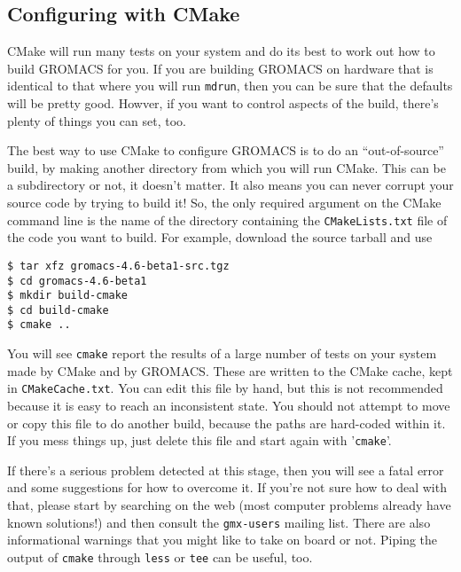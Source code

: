 \documentclass{article}[12pt,a4paper,twoside]
\newcommand{\gromacs}{GROMACS}
\newcommand{\cmake}{CMake}
\begin{document}
\subsection{Configuring with \cmake{}}

\cmake{} will run many tests on your system and do its best to work
out how to build \gromacs{} for you. If you are building \gromacs{} on
hardware that is identical to that where you will run \texttt{mdrun},
then you can be sure that the defaults will be pretty good. Howver, if
you want to control aspects of the build, there's plenty of things you
can set, too.

The best way to use \cmake{} to configure \gromacs{} is to do an
``out-of-source'' build, by making another directory from which you
will run \cmake{}. This can be a subdirectory or not, it doesn't
matter. It also means you can never corrupt your source code by trying
to build it! So, the only required argument on the \cmake{} command
line is the name of the directory containing the
\texttt{CMakeLists.txt} file of the code you want to build. For
example, download the source tarball and use
\begin{verbatim}
$ tar xfz gromacs-4.6-beta1-src.tgz
$ cd gromacs-4.6-beta1
$ mkdir build-cmake
$ cd build-cmake
$ cmake ..
\end{verbatim}

You will see \texttt{cmake} report the results of a large number of
tests on your system made by \cmake{} and by \gromacs{}. These are
written to the \cmake{} cache, kept in \texttt{CMakeCache.txt}. You
can edit this file by hand, but this is not recommended because it is
easy to reach an inconsistent state. You should not attempt to move or
copy this file to do another build, because the paths are hard-coded
within it. If you mess things up, just delete this file and start
again with '\verb+cmake+'.

If there's a serious problem detected at this stage, then you will see
a fatal error and some suggestions for how to overcome it. If you're
not sure how to deal with that, please start by searching on the web
(most computer problems already have known solutions!) and then
consult the \texttt{gmx-users} mailing list. There are also
informational warnings that you might like to take on board or
not. Piping the output of \texttt{cmake} through \texttt{less} or
\texttt{tee} can be useful, too.
\end{document}
